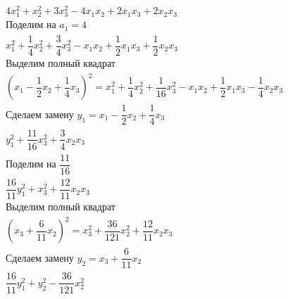 \documentclass[12pt]{article}
\begin{document}
    \[
        \begin{array}{l}
            4x_1^2 + x_2^2 + 3x_3^2 - 4x_1x_2 + 2x_1x_3 + 2x_2x_3                                                                                           \\
            \text{Поделим на } a_1 = 4                                                                                                                      \\
            x_1^2 + \dfrac{1}{4}x_2^2 + \dfrac{3}{4}x_3^2 - x_1x_2 + \dfrac{1}{2}x_1x_3 + \dfrac{1}{2}x_2x_3                                                \\
            \text{Выделим полный квадрат}                                                                                                                   \\
            (x_1 - \dfrac{1}{2}x_2 + \dfrac{1}{4}x_3)^2 = x_1^2 + \dfrac{1}{4}x_2^2 + \dfrac{1}{16}x_3^2 - x_1x_2 + \dfrac{1}{2}x_1x_3 - \dfrac{1}{4}x_2x_3 \\
            \text{Сделаем замену } y_1 = x_1 - \dfrac{1}{2}x_2 + \dfrac{1}{4}x_3                                                                            \\
            y_1^2 + \dfrac{11}{16}x_3^2 + \dfrac{3}{4}x_2x_3                                                                                                \\
            \text{Поделим на } \dfrac{11}{16}                                                                                                               \\
            \dfrac{16}{11}y_1^2 + x_3^2 + \dfrac{12}{11}x_2x_3                                                                                              \\
            \text{Выделим полный квадрат}                                                                                                                   \\
            (x_3 + \dfrac{6}{11}x_2)^2 = x_3^2 + \dfrac{36}{121}x_2^2 + \dfrac{12}{11}x_2x_3                                                                \\
            \text{Сделаем замену } y_2 = x_3 + \dfrac{6}{11}x_2                                                                                             \\
            \dfrac{16}{11}y_1^2 + y_2^2 - \dfrac{36}{121}x_2^2                                                                                              \\

\end{array}\]
\end{document}
